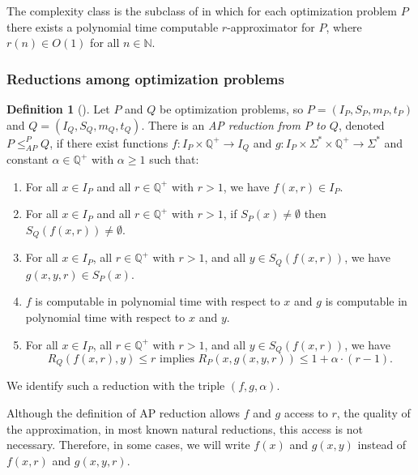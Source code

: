 \documentclass[]{article}
\theoremstyle{plain}
\theoremstyle{definition}
\newtheorem{definition}{Definition}
\newcommand{\APr}{\leq_{AP}^{P}}
\begin{document}
The complexity class \APX{} is the subclass of \NPO{} in which for each optimization problem $P$ there exists a polynomial time computable $r$-approximator for $P$, where $r(n) \in O(1)$ for all $n \in \mathbb{N}$.

\subsubsection{Reductions among optimization problems}

\begin{definition}[{\cite[Definition~8.3]{book}}]
  Let $P$ and $Q$ be optimization problems, so $P = (I_P, S_P, m_P, t_P)$ and $Q = (I_Q, S_Q, m_Q, t_Q)$.
  There is an \emph{AP reduction from $P$ to $Q$}, denoted $P \APr Q$, if there exist functions $f \colon I_P \times \mathbb{Q}^+ \to I_Q$ and $g \colon I_P \times \Sigma^* \times \mathbb{Q}^+ \to \Sigma^*$ and constant $\alpha \in \mathbb{Q}^+$ with $\alpha \geq 1$ such that:
  \begin{enumerate}
  \item For all $x \in I_P$ and all $r \in \mathbb{Q}^+$ with $r > 1$, we have $f(x, r) \in I_P$.
  \item For all $x \in I_P$ and all $r \in \mathbb{Q}^+$ with $r > 1$, if $S_P(x) \neq \emptyset$ then $S_Q(f(x, r)) \neq \emptyset$.
  \item For all $x \in I_P$, all $r \in \mathbb{Q}^+$ with $r > 1$, and all $y \in S_Q(f(x, r))$, we have $g(x, y, r) \in S_P(x)$.
  \item $f$ is computable in polynomial time with respect to $x$ and $g$ is computable in polynomial time with respect to $x$ and $y$.
  \item For all $x \in I_P$, all $r \in \mathbb{Q}^+$ with $r > 1$, and all $y \in S_Q(f(x, r))$, we have
    \begin{equation*}
      R_Q(f(x, r), y) \leq r \text{ implies } R_P(x, g(x, y, r)) \leq 1 + \alpha \cdot (r - 1).
    \end{equation*}
  \end{enumerate}
  We identify such a reduction with the triple $(f, g, \alpha)$.
\end{definition}

Although the definition of AP reduction allows $f$ and $g$ access to $r$, the quality of the approximation, in most known natural reductions, this access is not necessary.
Therefore, in some cases, we will write $f(x)$ and $g(x, y)$ instead of $f(x, r)$ and $g(x, y, r)$.
\end{document}
